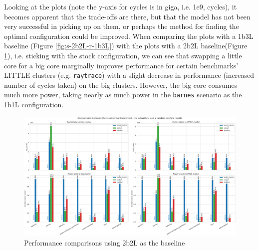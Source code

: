     Looking at the plots (note the y-axis for cycles is in giga, i.e. 
    \textsf{1e9}, cycles), it becomes apparent that the trade-offs are there, 
    but that the model has not been very successful in picking up on them, or 
    perhaps the method for finding the optimal configuration could be improved.
    When comparing the plots with a 1b3L baseline (Figure 
    \ref{fig:s-2b2L-r-1b3L}) with the plots with a 2b2L baseline(Figure 
    \ref{fig:s-2b2L-r-2b2L}), i.e. sticking with the stock configuration, we can
    see that swapping a little core for a big core marginally improves 
    performance for certain benchmarks' LITTLE clusters (e.g. \texttt{raytrace})
    with a slight decrease in performance (increased number of cycles taken) on 
    the big clusters. However, the big core consumes much more power, taking 
    nearly as much power in the \texttt{barnes} scenario as the 1b1L 
    configuration.
    \begin{figure}[H]
        \centering
        \includegraphics[width=\textwidth]{pred-plots/stock-2b2L/rand-2b2L.png}
        \caption{Performance comparisons using 2b2L as the baseline}
        \label{fig:s-2b2L-r-2b2L}
    \end{figure}

